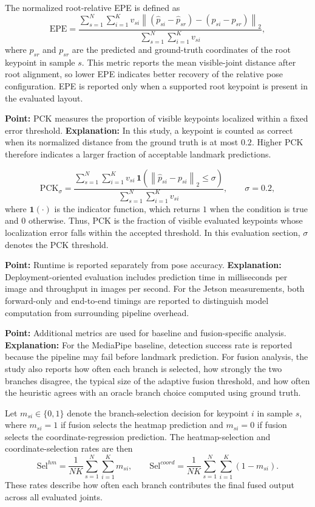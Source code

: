 \documentclass[10pt,letterpaper]{article}
\begin{document}
The normalized root-relative EPE is defined as
\[
\mathrm{EPE} =
\frac{
\sum_{s=1}^{N}
\sum_{i=1}^{K}
v_{si}
\left\|
(\hat{p}_{si} - \hat{p}_{sr}) - (p_{si} - p_{sr})
\right\|_2
}{
\sum_{s=1}^{N}
\sum_{i=1}^{K}
v_{si}
},
\]
where \(\hat{p}_{sr}\) and \(p_{sr}\) are the predicted and ground-truth coordinates of the root keypoint in sample \(s\). This metric reports the mean visible-joint distance after root alignment, so lower EPE indicates better recovery of the relative pose configuration. EPE is reported only when a supported root keypoint is present in the evaluated layout.

\medskip
\noindent\textbf{Point:} PCK measures the proportion of visible keypoints localized within a fixed error threshold.  
\textbf{Explanation:} In this study, a keypoint is counted as correct when its normalized distance from the ground truth is at most \(0.2\). Higher PCK therefore indicates a larger fraction of acceptable landmark predictions.

\[
\mathrm{PCK}_{\sigma} =
\frac{
\sum_{s=1}^{N}
\sum_{i=1}^{K}
v_{si}\,\mathbf{1}
\left(
\left\|
\hat{p}_{si} - p_{si}
\right\|_2 \le \sigma
\right)
}{
\sum_{s=1}^{N}
\sum_{i=1}^{K}
v_{si}
},
\qquad \sigma = 0.2,
\]
where \(\mathbf{1}(\cdot)\) is the indicator function, which returns \(1\) when the condition is true and \(0\) otherwise. Thus, PCK is the fraction of visible evaluated keypoints whose localization error falls within the accepted threshold. In this evaluation section, \(\sigma\) denotes the PCK threshold.

\medskip
\noindent\textbf{Point:} Runtime is reported separately from pose accuracy.  
\textbf{Explanation:} Deployment-oriented evaluation includes prediction time in milliseconds per image and throughput in images per second. For the Jetson measurements, both forward-only and end-to-end timings are reported to distinguish model computation from surrounding pipeline overhead.

\medskip
\noindent\textbf{Point:} Additional metrics are used for baseline and fusion-specific analysis.  
\textbf{Explanation:} For the MediaPipe baseline, detection success rate is reported because the pipeline may fail before landmark prediction. For fusion analysis, the study also reports how often each branch is selected, how strongly the two branches disagree, the typical size of the adaptive fusion threshold, and how often the heuristic agrees with an oracle branch choice computed using ground truth.

Let \(m_{si} \in \{0,1\}\) denote the branch-selection decision for keypoint \(i\) in sample \(s\), where \(m_{si}=1\) if fusion selects the heatmap prediction and \(m_{si}=0\) if fusion selects the coordinate-regression prediction. The heatmap-selection and coordinate-selection rates are then
\[
\mathrm{Sel}^{hm} =
\frac{1}{NK}
\sum_{s=1}^{N}\sum_{i=1}^{K} m_{si},
\qquad
\mathrm{Sel}^{coord} =
\frac{1}{NK}
\sum_{s=1}^{N}\sum_{i=1}^{K} (1-m_{si}).
\]
These rates describe how often each branch contributes the final fused output across all evaluated joints.
\end{document}

